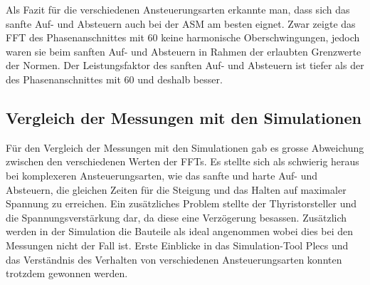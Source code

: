 Als Fazit für die verschiedenen Ansteuerungsarten erkannte man, dass sich das sanfte Auf- und Absteuern auch bei der ASM am besten eignet. Zwar zeigte das FFT des Phasenanschnittes mit 60\textdegree \hspace{0.02cm} keine harmonische Oberschwingungen, jedoch waren sie beim sanften Auf- und Absteuern in Rahmen der erlaubten Grenzwerte der Normen. Der Leistungsfaktor des sanften Auf- und Absteuern ist tiefer als der des Phasenanschnittes mit 60\textdegree \hspace{0.02cm} und deshalb besser. 

\subsection{Vergleich der Messungen mit den Simulationen}
Für den Vergleich der Messungen mit den Simulationen gab es grosse Abweichung zwischen den verschiedenen Werten der FFTs. Es stellte sich als schwierig heraus bei komplexeren Ansteuerungsarten, wie das sanfte und harte Auf- und Absteuern, die gleichen Zeiten für die Steigung und das Halten auf maximaler Spannung zu erreichen. Ein zusätzliches Problem stellte der Thyristorsteller und die Spannungsverstärkung dar, da diese eine Verzögerung besassen. Zusätzlich werden in der Simulation die Bauteile als ideal angenommen wobei dies bei den Messungen nicht der Fall ist. Erste Einblicke in das Simulation-Tool Plecs und das Verständnis des Verhalten von verschiedenen Ansteuerungsarten konnten trotzdem gewonnen werden. 








